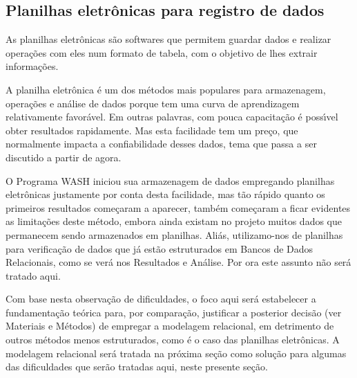 \documentclass[
12pt,		%
openright,	%
twoside,  %
a4paper,			%
chapter=TITLE,		%
english,			%
french,				%
spanish,			%
brazil				%
]{USPSC-classe/USPSC}
\begin{document}
\subsection[Planilhas eletr\^onicas para registro de dados]{Planilhas eletr\^onicas para registro de dados}\label{Planilhas eletr\^onicas para registro de dados}
As planilhas eletr\^onicas s\~ao softwares que permitem guardar  dados e realizar opera\c{c}\~oes com eles num formato de tabela, com o objetivo de lhes extrair informa\c{c}\~oes.










A planilha eletr\^onica \'e um dos m\'etodos mais populares para armazenagem, opera\c{c}\~oes e an\'alise de dados porque tem uma curva de aprendizagem relativamente favor\'avel. Em outras palavras, com pouca capacita\c{c}\~ao \'e poss\'{\i}vel obter resultados rapidamente. Mas esta facilidade tem um pre\c{c}o, que normalmente impacta a confiabilidade desses dados, tema que passa a ser discutido a partir de agora.










O Programa WASH iniciou sua armazenagem de dados empregando planilhas eletr\^onicas justamente por conta desta facilidade, mas t\~ao r\'apido quanto os primeiros resultados come\c{c}aram a aparecer, tamb\'em come\c{c}aram a ficar evidentes as limita\c{c}\~oes deste m\'etodo, embora ainda existam no projeto muitos dados que permanecem sendo armazenados em planilhas. Ali\'as, utilizamo-nos de planilhas para verifica\c{c}\~ao de dados que j\'a est\~ao estruturados em Bancos de Dados Relacionais, como se ver\'a nos Resultados e An\'alise. Por ora este assunto n\~ao ser\'a tratado aqui.










Com base nesta observa\c{c}\~ao de dificuldades, o foco aqui ser\'a estabelecer a fundamenta\c{c}\~ao te\'orica para, por compara\c{c}\~ao, justificar a posterior decis\~ao (ver Materiais e M\'etodos) de empregar a modelagem relacional, em detrimento de outros m\'etodos menos estruturados, como \'e o caso das planilhas eletr\^onicas. A modelagem relacional ser\'a tratada na pr\'oxima se\c{c}\~ao como solu\c{c}\~ao para algumas das dificuldades que ser\~ao tratadas aqui, neste presente se\c{c}\~ao.
\end{document}
